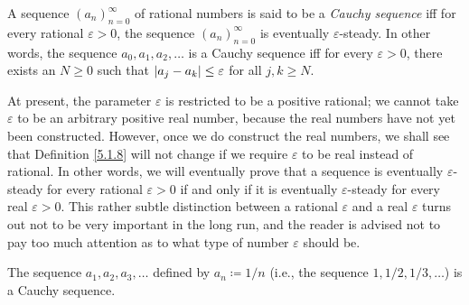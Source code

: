 \setcounter{theorem}{7}
\begin{definition}\label{5.1.8}
    A sequence \((a_n)_{n = 0}^{\infty}\) of rational numbers is said to be a \emph{Cauchy sequence} iff for every rational \(\varepsilon > 0\), the sequence \((a_n)_{n = 0}^{\infty}\) is eventually \(\varepsilon\)-steady.
    In other words, the sequence \(a_0, a_1, a_2, \dots\) is a Cauchy sequence iff for every \(\varepsilon > 0\), there exists an \(N \geq 0\) such that \(\abs*{a_j - a_k} \leq \varepsilon\) for all \(j, k \geq N\).
\end{definition}

\begin{remark}\label{5.1.9}
    At present, the parameter \(\varepsilon\) is restricted to be a positive rational;
    we cannot take \(\varepsilon\) to be an arbitrary positive real number, because the real numbers have not yet been constructed.
    However, once we do construct the real numbers, we shall see that Definition \ref{5.1.8} will not change if we require \(\varepsilon\) to be real instead of rational.
    In other words, we will eventually prove that a sequence is eventually \(\varepsilon\)-steady for every rational \(\varepsilon > 0\) if and only if it is eventually \(\varepsilon\)-steady for every real \(\varepsilon > 0\).
    This rather subtle distinction between a rational \(\varepsilon\) and a real \(\varepsilon\) turns out not to be very important in the long run, and the reader is advised not to pay too much attention as to what type of number \(\varepsilon\) should be.
\end{remark}

\setcounter{theorem}{10}
\begin{proposition}\label{5.1.11}
    The sequence \(a_1, a_2, a_3, \dots\) defined by \(a_n \coloneqq 1 / n\) (i.e., the sequence \(1, 1 / 2, 1 / 3, \dots\)) is a Cauchy sequence.
\end{proposition}

